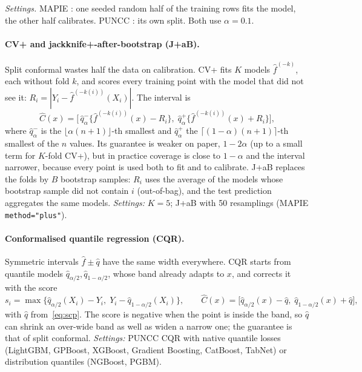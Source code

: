 \documentclass[11pt]{article}
\begin{document}
\emph{Settings.} MAPIE \cite{taquet2022mapie}: one seeded random half of the training rows fits the model, the other half
calibrates. PUNCC \cite{mendil2023puncc}: its own split. Both use $\alpha=0.1$.

\paragraph{CV+ and jackknife+-after-bootstrap (J+aB).} Split conformal wastes half the data on calibration. CV+
\cite{barber2021jackknife} fits $K$ models $\hat f^{(-k)}$, each without fold $k$, and scores every training point
with the model that did not see it: $R_i=|Y_i-\hat f^{(-k(i))}(X_i)|$. The interval is
\begin{equation}\label{eq:cvplus}
\hat C(x)=\Big[\,\hat q^-_{\alpha}\big\{\hat f^{(-k(i))}(x)-R_i\big\},\;\hat q^+_{\alpha}\big\{\hat f^{(-k(i))}(x)+R_i\big\}\Big],
\end{equation}
where $\hat q^-_\alpha$ is the $\lfloor\alpha(n+1)\rfloor$-th smallest and $\hat q^+_\alpha$ the
$\lceil(1-\alpha)(n+1)\rceil$-th smallest of the $n$ values. Its guarantee is weaker on paper, $1-2\alpha$ (up to a small
term for $K$-fold CV+), but in practice coverage is close to $1-\alpha$ and the interval narrower, because every point
is used both to fit and to calibrate. J+aB \cite{kim2020jab} replaces the folds by $B$ bootstrap samples: $R_i$ uses the
average of the models whose bootstrap sample did not contain $i$ (out-of-bag), and the test prediction aggregates the same
models. \emph{Settings:} $K=5$; J+aB with 50 resamplings (MAPIE \texttt{method="plus"}).

\paragraph{Conformalised quantile regression (CQR).} Symmetric intervals $\hat f\pm\hat q$ have the same width everywhere.
CQR \cite{romano2019cqr} starts from quantile models $\hat q_{\alpha/2},\hat q_{1-\alpha/2}$, whose band already adapts to
$x$, and corrects it with the score
\begin{equation}
s_i=\max\big\{\hat q_{\alpha/2}(X_i)-Y_i,\;Y_i-\hat q_{1-\alpha/2}(X_i)\big\},\qquad
\hat C(x)=\big[\hat q_{\alpha/2}(x)-\hat q,\;\hat q_{1-\alpha/2}(x)+\hat q\big],
\end{equation}
with $\hat q$ from~\eqref{eq:scp}. The score is negative when the point is inside the band, so $\hat q$ can shrink an
over-wide band as well as widen a narrow one; the guarantee is that of split conformal. \emph{Settings:} PUNCC CQR with
native quantile losses (LightGBM, GPBoost, XGBoost, Gradient Boosting, CatBoost, TabNet) or distribution quantiles (NGBoost, PGBM).
\end{document}
